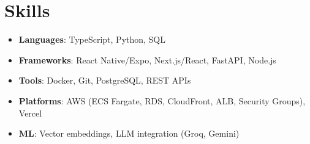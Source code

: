 \documentclass[letterpaper,11pt]{article}
\newcommand{\resumeItem}[2]{
  \item\small{
    \textbf{#1}{: #2 \vspace{-2pt}}
  }
}
\newcommand{\resumeSubItem}[2]{\resumeItem{#1}{#2}\vspace{-4pt}}
\newcommand{\resumeSubHeadingListStart}{\begin{itemize}[leftmargin=*]}
\newcommand{\resumeSubHeadingListEnd}{\end{itemize}}
\begin{document}
\section{Skills}
 \resumeSubHeadingListStart
   \resumeSubItem{Languages}{TypeScript, Python, SQL}
   \resumeSubItem{Frameworks}{React Native/Expo, Next.js/React, FastAPI, Node.js}
   \resumeSubItem{Tools}{Docker, Git, PostgreSQL, REST APIs}
   \resumeSubItem{Platforms}{AWS (ECS Fargate, RDS, CloudFront, ALB, Security Groups), Vercel}
   \resumeSubItem{ML}{Vector embeddings, LLM integration (Groq, Gemini)}
 \resumeSubHeadingListEnd


\end{document}
